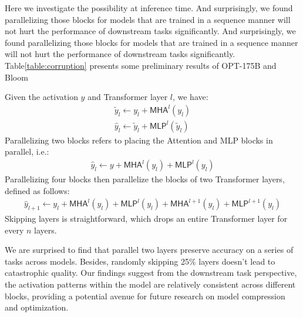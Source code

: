Here we investigate the possibility at inference time. And surprisingly, we found parallelizing those blocks for models that are trained in a sequence manner will not hurt the performance of downstream tasks significantly. And surprisingly, we found parallelizing those blocks for models that are trained in a sequence manner will not hurt the performance of downstream tasks significantly. Table\ref{table:corruption} presents some preliminary results of OPT-175B and Bloom

Given the activation $y$ and Transformer layer $l$, we have:
\begin{align*}
    \widetilde{y}_l \leftarrow y_l + \mathsf{MHA}^{l}(y_l) \\
   \widehat{y}_l \leftarrow \widetilde{y}_l + \mathsf{MLP}^{l}(\widetilde{y}_l)
\end{align*}
Parallelizing two blocks refers to placing the Attention and MLP blocks in parallel, i.e.:
\begin{align*}
    \widehat{y}_l \leftarrow y + \mathsf{MHA}^{l}(y_l) + \mathsf{MLP}^{l}(y_l)
\end{align*}
Parallelizing four blocks then parallelize the blocks of two Transformer layers, defined as follows:
\begin{align*}
    \widehat{y}_{l+1} \leftarrow y_l + \mathsf{MHA}^{l}(y_l) + \mathsf{MLP}^{l}(y_l)
    + \mathsf{MHA}^{l+1}(y_l) + \mathsf{MLP}^{l+1}(y_l)
\end{align*}
Skipping layers is straightforward, which drops an entire Transformer layer for every $n$ layers.


We are surprised to find that parallel two layers preserve accuracy on a series of tasks across models. Besides, randomly skipping 25\% layers doesn't lead to catastrophic quality. Our findings suggest from the downstream task perspective, the activation patterns within the model are relatively consistent across different blocks, providing a potential avenue for future research on model compression and optimization.




